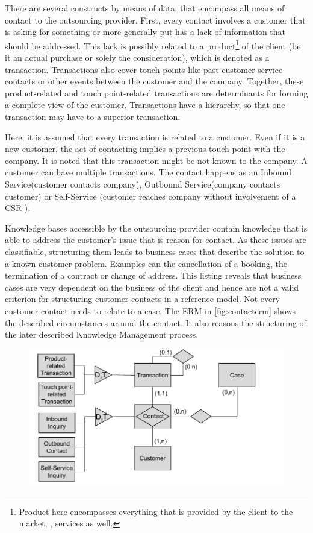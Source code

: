 	 There are several constructs by means of data, that encompass all means of contact to the outsourcing provider. First, every contact involves a customer that is asking for something or more generally put has a lack of information that should be addressed. This lack is possibly related to a product\footnote{Product here encompasses everything that is provided by the client to the market, \ie, services as well.} of the client (be it an actual purchase or solely the consideration), which is denoted as a transaction. Transactions also cover touch points like past customer service contacts or other events between the customer and the company. Together, these product-related and touch point-related transactions are determinants for forming a complete view of the customer. Transactions have a hierarchy, so that one transaction may have to a superior transaction. 
	 
	 Here, it is assumed that every transaction is related to a customer. Even if it is a new customer, the act of contacting implies a previous touch point with the company. It is noted that this transaction might be not known to the company. A customer can have multiple transactions. The contact happens as an Inbound Service(customer contacts company), Outbound Service(company contacts customer) or Self-Service (customer reaches company without involvement of a \acrshort{CSR} ). 
	 
	 Knowledge bases accessible by the outsourcing provider contain knowledge that is able to address the customer's issue that is reason for contact. As these issues are classifiable, structuring them leads to business cases that describe the solution to a known customer problem. Examples can the cancellation of a booking, the termination of a contract or change of address. This listing reveals that business cases are very dependent on the business of the client and hence are not a valid criterion for structuring customer contacts in a reference model. Not every customer contact needs to relate to a case. The \acrshort{ERM} in \Fig \ref{fig:contacterm} shows the described circumstances around the contact. It also reasons the structuring of the later described Knowledge Management process. 
	 
	 \begin{figure}[caption={\acrshort{ERM} of customer-facing services}, label={fig:contacterm}]
	 	{	\includegraphics[width=.8\textwidth]{figures/contacterm.pdf}}
	 \end{figure} 
	 
